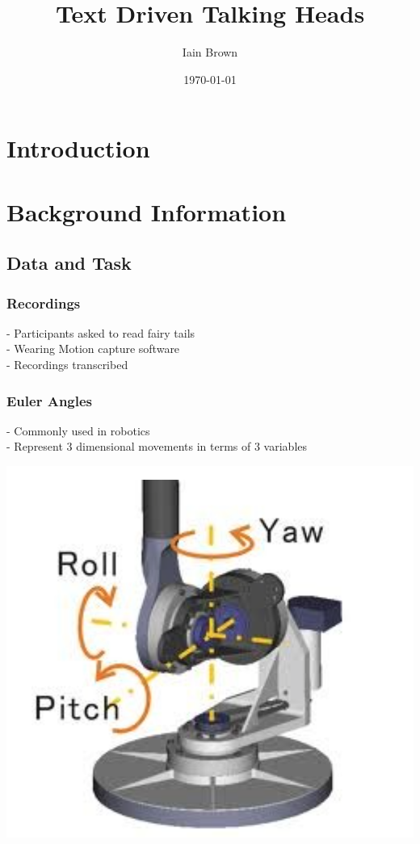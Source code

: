 \documentclass[bsc,frontabs,twoside,singlespacing,parskip]{infthesis}
\begin{document}
\title{Text Driven Talking Heads}

\author{Iain Brown}

\date{\today}
\maketitle
\tableofcontents

\chapter{Introduction}
\chapter{Background Information}
\section{Data and Task}
\subsection{Recordings}
- Participants asked to read fairy tails \\
- Wearing Motion capture software \\
- Recordings transcribed \\
\subsection{Euler Angles}
- Commonly used in robotics \\
- Represent 3 dimensional movements in terms of 3 variables\\

\begin{center}
	\includegraphics[width=.5\textwidth]{euler_angles.png}
\end{center}
\end{document}
